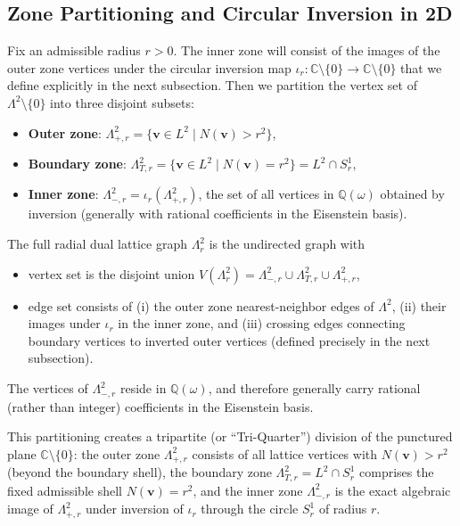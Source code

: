 \documentclass{article}
\begin{document}
\subsection{Zone Partitioning and Circular Inversion in 2D}
\label{subsec:2d-zone-partitioning}
Fix an admissible radius $r > 0$. The inner zone will consist of the images of the outer zone vertices under the circular inversion map $\iota_r : \mathbb{C} \setminus \{0\} \to \mathbb{C} \setminus \{0\}$ that we define explicitly in the next subsection. Then we partition the vertex set of $\Lambda^2 \setminus \{0\}$ into three disjoint subsets:
\begin{itemize}
  \item \textbf{Outer zone}: $\Lambda_{+,r}^2 = \{ \mathbf{v} \in L^2 \mid N(\mathbf{v}) > r^2 \}$,
  \item \textbf{Boundary zone}: $\Lambda_{T,r}^2 = \{ \mathbf{v} \in L^2 \mid N(\mathbf{v}) = r^2 \} = L^2 \cap S_r^1$,
  \item \textbf{Inner zone}: $\Lambda_{-,r}^2 = \iota_r(\Lambda_{+,r}^2)$, the set of all vertices in $\mathbb{Q}(\omega)$ obtained by inversion (generally with rational coefficients in the Eisenstein basis).
\end{itemize}
The full radial dual lattice graph $\Lambda_r^2$ is the undirected graph with
\begin{itemize}
  \item vertex set is the disjoint union $V(\Lambda_r^2) = \Lambda_{-,r}^2 \cup \Lambda_{T,r}^2 \cup \Lambda_{+,r}^2$,
  \item edge set consists of (i) the outer zone nearest-neighbor edges of $\Lambda^2$, (ii) their images under $\iota_r$ in the inner zone, and (iii) crossing edges connecting boundary vertices to inverted outer vertices (defined precisely in the next subsection).
\end{itemize}
The vertices of $\Lambda_{-,r}^2$ reside in $\mathbb{Q}(\omega)$, and therefore generally carry rational (rather than integer) coefficients in the Eisenstein basis.

This partitioning creates a tripartite (or ``Tri-Quarter'') division of the punctured plane $\mathbb{C} \setminus \{0\}$: the outer zone $\Lambda_{+,r}^2$ consists of all lattice vertices with $N(\mathbf{v}) > r^2$ (beyond the boundary shell), the boundary zone $\Lambda_{T,r}^2 = L^2 \cap S_r^1$ comprises the fixed admissible shell $N(\mathbf{v}) = r^2$, and the inner zone $\Lambda_{-,r}^2$ is the exact algebraic image of $\Lambda_{+,r}^2$ under inversion of $\iota_r$ through the circle $S_r^1$ of radius $r$.
\end{document}
